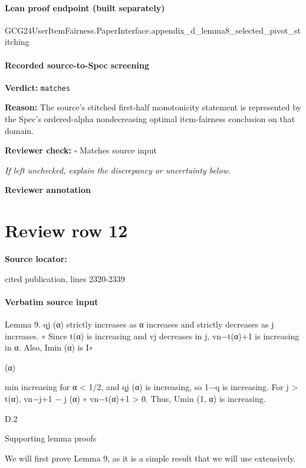 \documentclass[10pt]{article}
\newcommand{\reviewerbox}{%
  \par\noindent\fbox{\parbox{0.96\linewidth}{\rule{0pt}{0.38in}}}\par
}
\newcommand{\reviewmatch}[1]{%
  \par\noindent\textbf{Reviewer check:} $\square$\; #1\par
  \noindent\emph{If left unchecked, explain the discrepancy or uncertainty below.}\par
}
\begin{document}
\paragraph{Lean proof endpoint (built separately)}\begin{ReviewVerbatim}
GCG24UserItemFairness.PaperInterface.appendix_d_lemma8_selected_pivot_stitching
\end{ReviewVerbatim}

\paragraph{Recorded source-to-Spec screening}
\textbf{Verdict:} \texttt{matches}
\\
{\raggedright
\textbf{Reason:} The source's stitched first-\allowbreak{}half monotonicity statement is represented by the Spec's ordered-\allowbreak{}alpha nondecreasing optimal item-\allowbreak{}fairness conclusion on that domain.\allowbreak{}
\par}
\reviewmatch{Matches source input}
\noindent\textbf{Reviewer annotation}\par
\reviewerbox
\clearpage
\hypertarget{source-claim-b15ee860ec553bb1}{}
\section*{Review row 12}
\textbf{Source locator:} {\footnotesize\raggedright cited publication, lines 2320-\allowbreak{}2339\par}
\paragraph{Verbatim source input}
\begin{ReviewVerbatim}
Lemma 9. qj (α) strictly increases as α increases and strictly decreases as j increases.
∗
Since t(α) is increasing and vj decreases in j, vn−t(α)+1 is increasing in α. Also, Imin
(α) is
I∗

(α)

min
increasing for α < 1/2, and qj (α) is increasing, so 1−q
is increasing. For j > t(α), vn−j+1 −
j (α)
∗
vn−t(α)+1 > 0. Thus, Umin (1, α) is increasing.

D.2

Supporting lemma proofs

We will first prove Lemma 9, as it is a simple result that we will use extensively.
\end{ReviewVerbatim}
\end{document}
